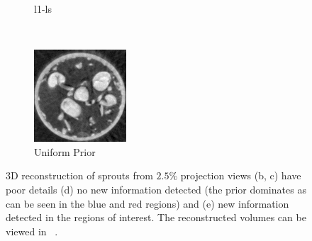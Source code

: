 \documentclass[journal]{IEEEtran}
\begin{document}
\begin{figure}[!h]
\begin{subfigure}[b]{0.3\linewidth}
        \caption{l1-ls}
     \end{subfigure}\\
\quad
    \begin{subfigure}[b]{0.3\linewidth}
        \includegraphics[width=\textwidth]{../images/sprouts/plainPriorIm.png}
        \caption{Uniform Prior}
     \end{subfigure}
     \caption{3D reconstruction of sprouts from $2.5\%$ projection
       views (b, c) have poor details (d) no new information detected
       (the prior dominates as can be seen in the blue and red
       regions) and (e) new information detected in the regions of
       interest. The reconstructed volumes can be viewed in
       ~\cite{supp_paper}.} 
\label{fig:sprouts_3D_results}
\end{figure}
\end{document}
